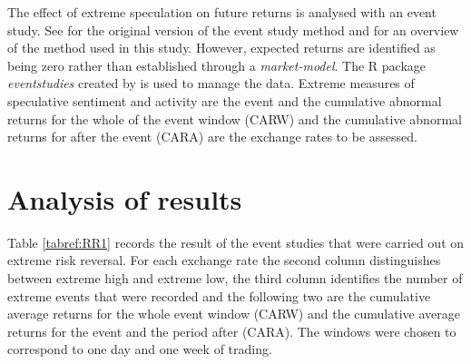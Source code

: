 \documentclass[preprint,12pt,authoryear]{elsarticle}
\begin{document}
The effect of extreme speculation on future returns is analysed with an event study.  See \citet{Dolly1933} for the original version of the event study method and \citet{FamaFisherJensenRoll} for an overview of the method used in this study. However, expected returns are identified as being zero rather than established through a \emph{market-model}.  The R package \emph{eventstudies} created by \citet{eventstudies} is used to manage the data.  Extreme measures of speculative sentiment and activity are the event and the cumulative abnormal returns for the whole of the event window (CARW) and the cumulative abnormal returns for after the event (CARA) are the exchange rates to be assessed. 

\section{Analysis of results}
  Table \ref{tabref:RR1} records the result of the event studies that were carried out on extreme risk reversal.   For each exchange rate the second column distinguishes between extreme high and extreme low, the third  column identifies the number of extreme events that were recorded and the following two are the cumulative average returns for the whole event window (CARW) and the cumulative average returns for the event and the period after (CARA).  The windows were chosen to correspond to one day and one week of trading.  
\end{document}
